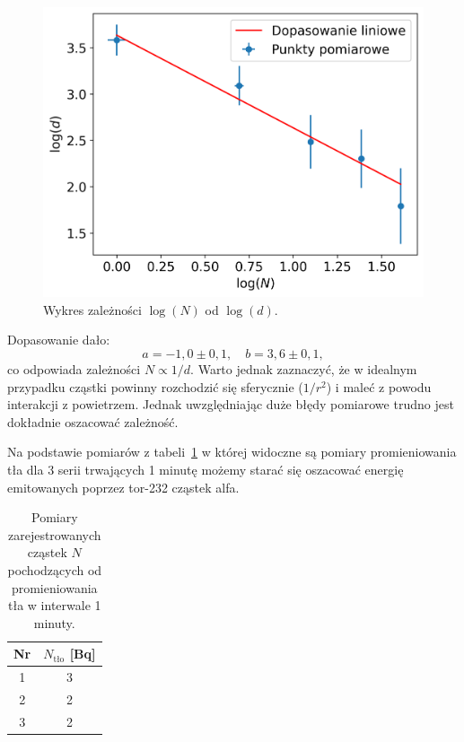 \documentclass[12pt]{article}
\begin{document}
\begin{figure}[H]
	\centering
	\includegraphics[scale=0.7]{distance_log}
	\caption{Wykres zależności $\log(N)$ od $\log(d)$.}
	\label{fig:distance_log}
\end{figure}

Dopasowanie dało:
\[
	a = -1{,}0 \pm 0{,}1, 
	\quad
	b = 3{,}6 \pm 0{,}1,
\]
co odpowiada zależności \(N \propto 1/d\). Warto jednak zaznaczyć, że w idealnym przypadku cząstki powinny rozchodzić się sferycznie (\(1/r^2\)) i maleć z powodu interakcji z powietrzem. Jednak uwzględniając duże błędy pomiarowe trudno jest dokładnie oszacować zależność.

Na podstawie pomiarów z tabeli~\ref{tab:background} w której widoczne są pomiary promieniowania tła dla 3 serii trwających 1 minutę możemy starać się oszacować energię emitowanych poprzez tor-232 cząstek alfa.
\begin{table}[H]
	\centering
	\begin{tabular}{c|c}
		\toprule
        Nr & $N_{\text{tło}}$ [Bq]\\
		\midrule
		1 & 3 \\
		2 & 2 \\
		3 & 2 \\
		\bottomrule
	\end{tabular}
	\caption{Pomiary zarejestrowanych cząstek \(N\) pochodzących od promieniowania tła w interwale 1 minuty.}
	\label{tab:background}
\end{table}
\end{document}

